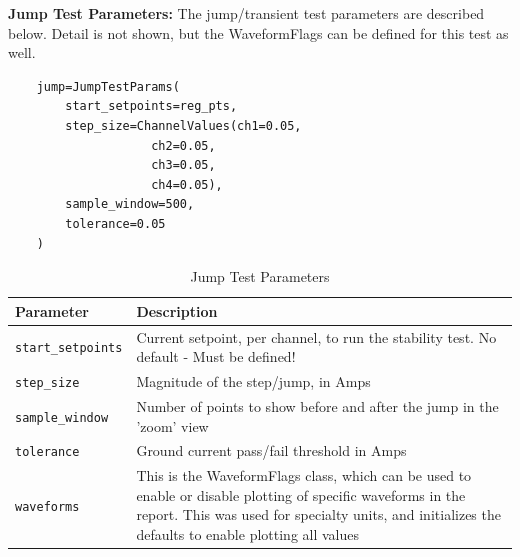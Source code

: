 \newpage
{}
\label{sec:jump-test-parameters}
\noindent\normalsize\textbf{Jump Test Parameters:} The jump/transient test parameters are described below. Detail is not shown, but the WaveformFlags can be defined for this test as well. 
\begin{verbatim}
	jump=JumpTestParams(
		start_setpoints=reg_pts,
		step_size=ChannelValues(ch1=0.05,
					ch2=0.05,
					ch3=0.05,
					ch4=0.05),
		sample_window=500,
		tolerance=0.05
	)
\end{verbatim}
\begin{table}[H]
	\centering
	\begin{tabular}{p{4cm}p{10cm}}
		\toprule
		\textbf{Parameter} & \textbf{Description} \\
		\midrule
		
		\texttt{start\_setpoints} &
		Current setpoint, per channel, to run the stability test. No default - Must be defined!\\
		
		\texttt{step\_size} &
		Magnitude of the step/jump, in Amps\\
		
		\texttt{sample\_window} &
		Number of points to show before and after the jump in the 'zoom' view\\
		
		\texttt{tolerance} &
		Ground current pass/fail threshold in Amps\\
		
		\texttt{waveforms} &
		This is the WaveformFlags class, which can be used to enable or disable plotting of specific waveforms in the report. This was used for specialty units, and initializes the defaults to enable plotting all values\\

		\bottomrule
	\end{tabular}
	\caption{Jump Test Parameters}
	\label{tab:jump-test-parameters}
\end{table}

\newpage






































